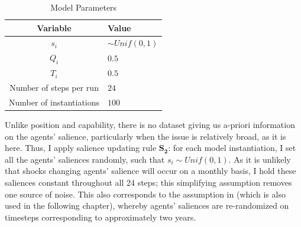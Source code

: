 \begin{table}[h!]
\centering
\caption{Model Parameters}
\label{table:model_parameters}
\begin{tabular}{cl}
    \hline
    Variable &  Value \\
    \hline
    $s_i$            &        $\sim Unif(0, 1)$          \\
    $Q_i$            &   $0.5$ \\
    $T_i$            &   $0.5$ \\
    \hline
    Number of steps per run &        $24$ \\
    Number of instantiations &        $100$ \\
    \hline
\end{tabular}
\tableSpace
\end{table}

Unlike position and capability, there is no dataset giving us a-priori information on the agents' salience, particularly when the issue is relatively broad, as it is here. Thus, I apply salience updating rule $\mathbf{S_2}$: for each model instantiation, I set all the agents' saliences randomly, such that $s_i \sim Unif(0,1)$. As it is unlikely that shocks changing agents' salience will occur on a monthly basis, I hold these saliences constant throughout all 24 steps; this simplifying assumption removes one source of noise. This also corresponds to the assumption in \citet{bdm_1998} (which is also used in the following chapter), whereby agents' saliences are re-randomized on timesteps corresponding to approximately two years.


